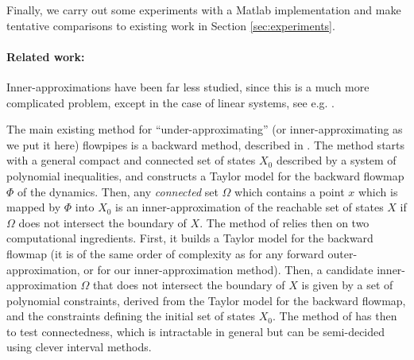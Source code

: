 \documentclass{sig-alternate-05-2015} %
\begin{document}
Finally, we carry out some 
experiments with a Matlab implementation and make tentative comparisons to existing work in Section \ref{sec:experiments}. 




\paragraph{Related work:}
\label{relatedwork}

Inner-approximations have been far less studied, 
since this is a much more complicated problem, except in the case of linear systems, 
see e.g. \cite{LeGuernic09,GirardLinear06}.

The main existing method for ``under-approximating'' (or inner-approximating as we put it 
here) flowpipes is a backward method, described in \cite{Underapproxflowpipes}. 
The method starts with a general
compact and connected 
set of states $X_0$ described by a system of polynomial inequalities, and constructs a Taylor
model for the backward flowmap $\Phi$ of the dynamics. Then, any {\em connected} set $\Omega$
which contains a point 
$x$ which is mapped by $\Phi$ into $X_0$ is an inner-approximation of the reachable set
of states $X$ if $\Omega$ does not intersect the boundary of 
$X$. The method of \cite{Underapproxflowpipes}
relies then on two computational ingredients. 
First, it builds a Taylor model for the backward flowmap (it is of the same order of complexity
as for any forward outer-approximation, or for our inner-approximation method). 
Then, a candidate inner-approximation $\Omega$ that does not intersect the boundary of $X$
is given by a set of polynomial constraints, derived
from the Taylor model for the backward flowmap, and the constraints defining the initial set
of states $X_0$. The method of \cite{Underapproxflowpipes} has then to test connectedness, which is intractable in general but
can be semi-decided using clever interval methods.
\end{document}
